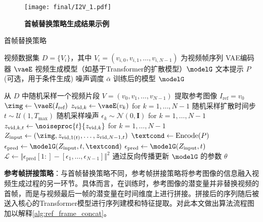 \begin{figure}[tp!]
    \centering
    \texttt{[image: final/I2V\_1.pdf]}
    \caption{\textbf{首帧替换策略生成结果示例}}
    \label{I2V_1}
\end{figure}
{\small
\begin{algorithm}[H]
    \setlength{\baselineskip}{0.9\baselineskip}
    \caption{首帧替换策略}
    \label{alg:first_frame_replacement}
    \begin{algorithmic}[1]
    \Require 
        \Statex 视频数据集 $D = \{V_i\}$，其中 $V_i = (v_{i,0}, v_{i,1}, \dots, v_{i,N-1})$ 为视频帧序列
        \Statex VAE编码器 $\vaeE$
        \Statex 视频生成模型（如基于Transformer的扩散模型）$\modelG$
        \Statex 文本提示 $P$ (可选，用于条件生成)
        \Statex 噪声调度 $\bar{\alpha}$
    \Ensure 训练后的模型 $\modelG$
    
        \State 从 $D$ 中随机采样一个视频片段 $V = (v_0, v_1, \dots, v_{N-1})$
        \State 提取参考图像 $I_{\text{ref}} = v_0$
        \State {}
        \State $\zimg \gets \vaeE(I_{\text{ref}})$
        \State {}
        \State $z_{\text{vid},k} \gets \vaeE(v_k)$ for $k=1, \dots, N-1$
        \State 随机采样扩散时间步 $t \sim \mathcal{U}(1, T_{\text{max}})$
        \State 随机采样噪声 $\epsilon_k \sim \mathcal{N}(0, \mathbf{I})$ for $k=1, \dots, N-1$
        \State {}
        \State  $z_{\text{vid},k,t}\gets \noiseproc{t}{z_{\text{vid},k}}$ for $k=1, \dots, N-1$
        \State {}
        \State $Z_{\text{input}} \gets (\zimg, z_{\text{vid},1(t)}, \dots, z_{\text{vid},N-1,t})$
            \State $\textcond \gets \text{Encode}(P)$ 
            \State $\epsilon_{\text{pred}} \gets \modelG(Z_{\text{input}}, t, \textcond)$
        \Else
            \State $\epsilon_{\text{pred}} \gets \modelG(Z_{\text{input}}, t)$
        \EndIf
        \State {}
        \State $\mathcal{L} \gets \Vert \epsilon_{\text{pred}}[1:] - [\epsilon_1, \dots, \epsilon_{N-1}] \Vert^2$ 
        \State 通过反向传播更新 $\modelG$ 的参数 $\theta$
    \EndFor
    \end{algorithmic}
\end{algorithm}
}

\textbf{参考帧拼接策略}：与首帧替换策略不同，参考帧拼接策略将参考图像的信息融入视频生成过程的另一环节。具体而言，在训练时，参考图像的潜变量并非替换视频的首帧，而是与视频最后一帧的潜变量在时间维度上进行拼接。拼接后的序列随后被送入核心的Transformer模型进行序列建模和特征提取。对此本文做出算法流程图加以解释\ref{alg:ref_frame_concat}。

